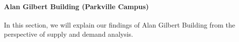 




\paragraph{Alan Gilbert Building (Parkville Campus)}
In this section, we will explain our findings of Alan Gilbert Building from the perspective of supply and demand analysis.

